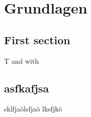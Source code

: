\chapter{Grundlagen}
\section{First section}
\ac{T} and \cite{stanley2002evolving} with \citeauthor{stanley2002evolving}
\newpage
\section{asfkafjsa}
sklfjaölsfjaö lksfjkö